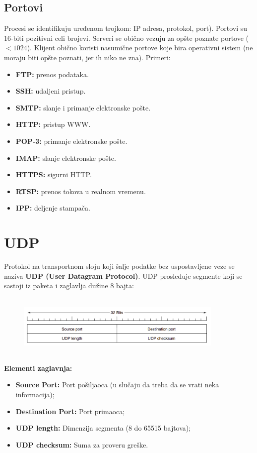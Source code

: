 \documentclass[a4paper]{article}
\begin{document}
    \subsection{Portovi}
        Procesi se identifikuju uređenom trojkom: IP adresa, protokol, port). Portovi su 16-biti
        pozitivni celi brojevi. Serveri se obično vezuju za opšte poznate portove ($<1024$).
        Klijent obično koristi nasumične portove koje bira operativni sistem (ne moraju biti
        opšte poznati, jer ih niko ne zna). Primeri:
        \begin{itemize}
            \item \textbf{FTP:} prenos podataka.
            \item \textbf{SSH:} udaljeni pristup.
            \item \textbf{SMTP:} slanje i primanje elektronske pošte.
            \item \textbf{HTTP:} pristup WWW.
            \item \textbf{POP-3:} primanje elektronske pošte.
            \item \textbf{IMAP:} slanje elektronske pošte.
            \item \textbf{HTTPS:} sigurni HTTP.
            \item \textbf{RTSP:} prenos tokova u realnom vremenu.
            \item \textbf{IPP:} deljenje stampača.
        \end{itemize}

\section{UDP}
    Protokol na transportnom sloju koji šalje podatke bez uspostavljene veze se naziva \textbf{UDP
    (User Datagram Protocol)}. UDP prosleđuje segmente koji se sastoji iz paketa i zaglavlja
    dužine 8 bajta:
    \begin{figure}[H]
        \begin{center}
            \includegraphics[width=100mm,height=30mm]{Slike/udp1.png}
        \end{center}
    \end{figure}
    \textbf{Elementi zaglavnja:}
    \begin{itemize}
        \item \textbf{Source Port:} Port pošiljaoca (u slučaju da treba da se vrati neka informacija);
        \item \textbf{Destination Port:} Port primaoca;
        \item \textbf{UDP length:} Dimenzija segmenta (8 do 65515 bajtova);
        \item \textbf{UDP checksum:} Suma za proveru greške.
    \end{itemize}
\end{document}
